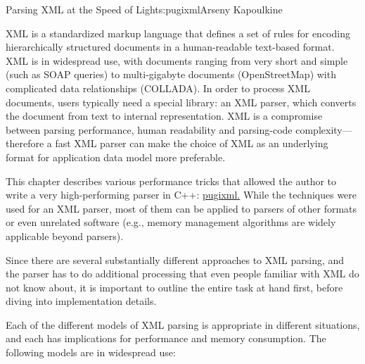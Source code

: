 \begin{aosachapter}{Parsing XML at the Speed of Light}{s:pugixml}{Arseny Kapoulkine}


XML is a standardized markup language that defines a set of rules for
encoding hierarchically structured documents in a human-readable
text-based format. XML is in widespread use, with documents ranging from
very short and simple (such as SOAP queries) to multi-gigabyte documents
(OpenStreetMap) with complicated data relationships (COLLADA). In order
to process XML documents, users typically need a special library: an XML
parser, which converts the document from text to internal
representation. XML is a compromise between parsing performance, human
readability and parsing-code complexity---therefore a fast XML parser
can make the choice of XML as an underlying format for application data
model more preferable.

This chapter describes various performance tricks that allowed the
author to write a very high-performing parser in C++:
\href{http://pugixml.org}{pugixml.} While the techniques were used for
an XML parser, most of them can be applied to parsers of other formats
or even unrelated software (e.g., memory management algorithms are
widely applicable beyond parsers).

Since there are several substantially different approaches to XML
parsing, and the parser has to do additional processing that even people
familiar with XML do not know about, it is important to outline the
entire task at hand first, before diving into implementation details.


Each of the different models of XML parsing is appropriate in different
situations, and each has implications for performance and memory
consumption. The following models are in widespread use:

\begin{aosaitemize}


\end{aosaitemize}
\end{aosachapter}
